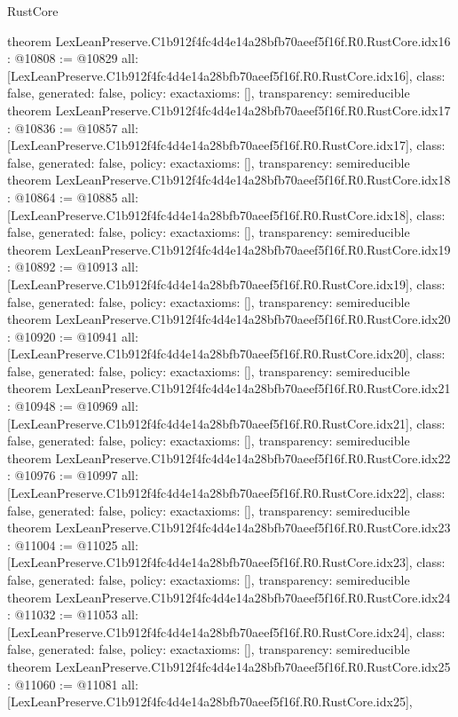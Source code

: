 \begin{lexlean}{RustCore}
\begin{coremodule}
{}
theorem LexLeanPreserve.C1b912f4fc4d4e14a28bfb70aeef5f16f.R0.RustCore.idx16 : @10808 := @10829 {
  all: [LexLeanPreserve.C1b912f4fc4d4e14a28bfb70aeef5f16f.R0.RustCore.idx16],
  class: false,
  generated: false,
  policy: exact{axioms: []},
  transparency: semireducible
}
theorem LexLeanPreserve.C1b912f4fc4d4e14a28bfb70aeef5f16f.R0.RustCore.idx17 : @10836 := @10857 {
  all: [LexLeanPreserve.C1b912f4fc4d4e14a28bfb70aeef5f16f.R0.RustCore.idx17],
  class: false,
  generated: false,
  policy: exact{axioms: []},
  transparency: semireducible
}
theorem LexLeanPreserve.C1b912f4fc4d4e14a28bfb70aeef5f16f.R0.RustCore.idx18 : @10864 := @10885 {
  all: [LexLeanPreserve.C1b912f4fc4d4e14a28bfb70aeef5f16f.R0.RustCore.idx18],
  class: false,
  generated: false,
  policy: exact{axioms: []},
  transparency: semireducible
}
theorem LexLeanPreserve.C1b912f4fc4d4e14a28bfb70aeef5f16f.R0.RustCore.idx19 : @10892 := @10913 {
  all: [LexLeanPreserve.C1b912f4fc4d4e14a28bfb70aeef5f16f.R0.RustCore.idx19],
  class: false,
  generated: false,
  policy: exact{axioms: []},
  transparency: semireducible
}
theorem LexLeanPreserve.C1b912f4fc4d4e14a28bfb70aeef5f16f.R0.RustCore.idx20 : @10920 := @10941 {
  all: [LexLeanPreserve.C1b912f4fc4d4e14a28bfb70aeef5f16f.R0.RustCore.idx20],
  class: false,
  generated: false,
  policy: exact{axioms: []},
  transparency: semireducible
}
theorem LexLeanPreserve.C1b912f4fc4d4e14a28bfb70aeef5f16f.R0.RustCore.idx21 : @10948 := @10969 {
  all: [LexLeanPreserve.C1b912f4fc4d4e14a28bfb70aeef5f16f.R0.RustCore.idx21],
  class: false,
  generated: false,
  policy: exact{axioms: []},
  transparency: semireducible
}
theorem LexLeanPreserve.C1b912f4fc4d4e14a28bfb70aeef5f16f.R0.RustCore.idx22 : @10976 := @10997 {
  all: [LexLeanPreserve.C1b912f4fc4d4e14a28bfb70aeef5f16f.R0.RustCore.idx22],
  class: false,
  generated: false,
  policy: exact{axioms: []},
  transparency: semireducible
}
theorem LexLeanPreserve.C1b912f4fc4d4e14a28bfb70aeef5f16f.R0.RustCore.idx23 : @11004 := @11025 {
  all: [LexLeanPreserve.C1b912f4fc4d4e14a28bfb70aeef5f16f.R0.RustCore.idx23],
  class: false,
  generated: false,
  policy: exact{axioms: []},
  transparency: semireducible
}
theorem LexLeanPreserve.C1b912f4fc4d4e14a28bfb70aeef5f16f.R0.RustCore.idx24 : @11032 := @11053 {
  all: [LexLeanPreserve.C1b912f4fc4d4e14a28bfb70aeef5f16f.R0.RustCore.idx24],
  class: false,
  generated: false,
  policy: exact{axioms: []},
  transparency: semireducible
}
theorem LexLeanPreserve.C1b912f4fc4d4e14a28bfb70aeef5f16f.R0.RustCore.idx25 : @11060 := @11081 {
  all: [LexLeanPreserve.C1b912f4fc4d4e14a28bfb70aeef5f16f.R0.RustCore.idx25],
}
\end{coremodule}
\end{lexlean}
